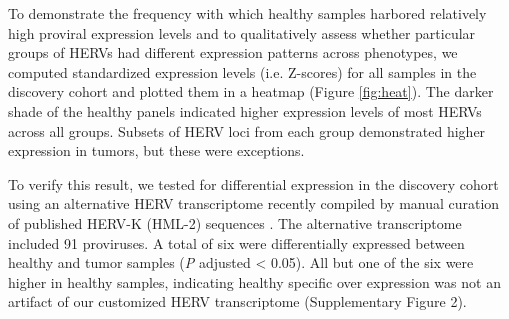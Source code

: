 To demonstrate the frequency with which healthy samples harbored relatively high proviral expression levels and to qualitatively assess whether particular groups of HERVs had different expression patterns across phenotypes, we computed standardized expression levels (i.e. Z-scores) for all samples in the discovery cohort and plotted them in a heatmap (Figure \ref{fig:heat}).
The darker shade of the healthy panels indicated higher expression levels of most HERVs across all groups.
Subsets of HERV loci from each group demonstrated higher expression in tumors, but these were exceptions.

To verify this result, we tested for differential expression in the discovery cohort using an alternative HERV transcriptome recently compiled by manual curation of published HERV-K (HML-2) sequences \citep{Grabski2020}.
The alternative transcriptome included 91 proviruses.
A total of six were differentially expressed between healthy and tumor samples (\emph{P} adjusted < 0.05).
All but one of the six were higher in healthy samples, indicating healthy specific over expression was not an artifact of our customized HERV transcriptome (Supplementary Figure 2).
